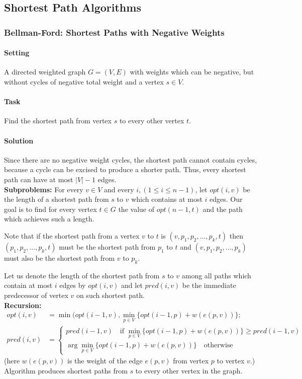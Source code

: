 \subsection{Shortest Path Algorithms}
\subsubsection{Bellman-Ford: Shortest Paths with Negative Weights}
\paragraph{Setting}
A directed weighted graph \(G=(V,E)\) with weights which can be negative, but without cycles of negative total weight and a vertex \(s \in V\).

\paragraph{Task}
Find the shortest path from vertex \(s\) to every other vertex \(t\).

\paragraph{Solution}
Since there are no negative weight cycles, the shortest path cannot contain cycles, because a cycle can be excised to produce a shorter path. Thus, every shortest path can have at most \(|V| - 1\) edges. \\
\textbf{Subproblems:}
For every \(v \in V\) and every \(i, (1 \leq i \leq n -1)\), let \(opt(i,v)\) be the length of a shortest path from \(s\) to \(v\) which contains at most \(i\) edges. Our goal is to find for every vertex \(t \in G\) the value of \(opt(n-1,t)\) and the path which achieves such a length.

Note that if the shortest path from a vertex \(v\) to \(t\) is \((v, p_1, p_2, \dots, p_k, t)\) then \((p_1, p_2, \dots, p_k, t)\) must be the shortest path from \(p_1\) to \(t\) and \((v, p_1, p_2, \dots, p_k)\) must also be the shortest path from \(v\) to \(p_k\).

Let us denote the length of the shortest path from \(s\) to \(v\) among all paths which contain at most \(i\) edges by \(opt(i,v)\) and let \(pred(i,v)\) be the immediate predecessor of vertex \(v\) on such shortest path. \\
\textbf{Recursion:}
\begin{align*}
    opt(i,v) & = \min(opt(i-1,v), \min_{p\in V} \{opt(i-1,p) + w(e(p,v))\}; \\
    pred(i,v) & =     
    \begin{cases}
        pred(i-1, v) \quad \text{if } \min_{p\in V} \{opt(i-1,p) + w(e(p,v))\} \geq pred(i-1,v)\\
        \arg\min_{p \in V} \{opt(i-1,p) + w(e(p,v))\} \quad \text{otherwise}
    \end{cases}
\end{align*}
(here \(w(e(p,v))\) is the weight of the edge \(e(p,v)\) from vertex \(p\) to vertex \(v\).)
Algorithm produces shortest paths from \(s\) to every other vertex in the graph.

